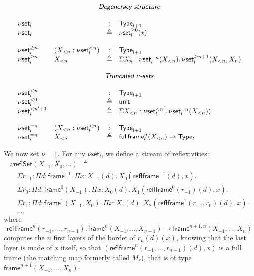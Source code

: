 \documentclass[12pt,landscape]{article}
\newcommand{\sort}[1]{\mathsf{Type}_{#1}}
\newcommand{\defeq}{\triangleq}
\newcommand{\partialcubset}[2]{\mathsf{\nu set}_{#1}^{<#2}}
\newcommand{\mycubset}[1]{\mathsf{\nu set}_{#1}}
\newcommand{\mycubsetfrom}[2]{\mathsf{\nu set}_{#1}^{\geq#2}}
\newcommand{\mycubsetcomp}[2]{\mathsf{\nu set}_{#1}^{=#2}}
\newcommand{\myfullbox}[1]{\mathsf{fullframe}_{#1}}
\newcommand{\unittype}{\mathsf{unit}}
\begin{document}
\begin{LARGE}
\begin{sf}
$$
\begin{array}{llcl}
\multicolumn{4}{c}{\mbox{\textsf{\textit{Degeneracy structure}}}}\\
\\
\mycubset{l} && : & \sort{l+1}\\
\mycubset{l} && \defeq & \mycubsetfrom{l}{0}(\star)\\
\\
\mycubsetfrom{l}{n} & (X_{<n}:\partialcubset{l}{n}) & : & \sort{l+1}\\
\mycubsetfrom{l}{n} & X_{<n} & \defeq & \Sigma X_n:\mycubsetcomp{l}{n}(X_{<n}).\,\mycubsetfrom{l}{n+1}(X_{<n},X_n)\\
\\
\multicolumn{4}{c}{\mbox{\textsf{\textit{Truncated $\nu$-sets}}}}\\
\\
\partialcubset{l}{n} && : & \sort{l+1}\\
\partialcubset{l}{0} && \defeq & \unittype\\
\partialcubset{l}{n'+1} && \defeq & \Sigma X_{<n}:\partialcubset{l}{n'}.\,\mycubsetcomp{l}{n}(X_{<n}))\\
\\
\mycubsetcomp{l}{n} & (X_{<n}:\partialcubset{l}{n}) & : & \sort{l+1}\\
\mycubsetcomp{l}{n} & X_{<n} & \defeq & \myfullbox{l}^{n}(X_{<n})\rightarrow \sort{l}\\
\end{array}
$$
\fi

We now set $\nu = 1$. For any $\mycubset{l}$, we define a stream of reflexivities:
$$
\begin{array}{lll}
\nu\textsf{reflSet}(X_{-1},X_0,...) ~~ \defeq \\
\quad \Sigma r_{-1}:\Pi d:\mathsf{frame}^{-1}.\,\Pi x:X_{-1}(d).\,X_0(\mathsf{reflframe}^{-1}(d),x).\\
\quad \Sigma r_0:\Pi d:\mathsf{frame}^0(X_{-1}).\,\Pi x:X_{0}(d).\,X_1(\mathsf{reflframe}^0(r_{-1})(d),x).\\
\quad \Sigma r_1:\Pi d:\mathsf{frame}^1(X_{-1},X_0).\,\Pi x:X_{1}(d).\,X_2(\mathsf{reflframe}^1(r_{-1},r_0)(d),x).\\
\quad ...
\end{array}
$$
where
$$\mathsf{reflframe}^n(r_{-1},...,r_{n-1}):\mathsf{frame}^n(X_{-1},...,X_{n-1})
\rightarrow \mathsf{frame}^{n+1,n}(X_{-1},...,X_{n})$$ computes the
$n$ first layers of the border of $r_{n}(d)(x)$, knowing that the last
layer is made of $x$ itself, so that
$(\mathsf{reflframe}^n(r_{-1},...,r_{n-1})(d),x)$ is a full frame (the matching map formerly called $M_r$),
that is of type $\mathsf{frame}^{n+1}(X_{-1},...,X_{n})$.


\end{sf}
\end{LARGE}
\end{document}
